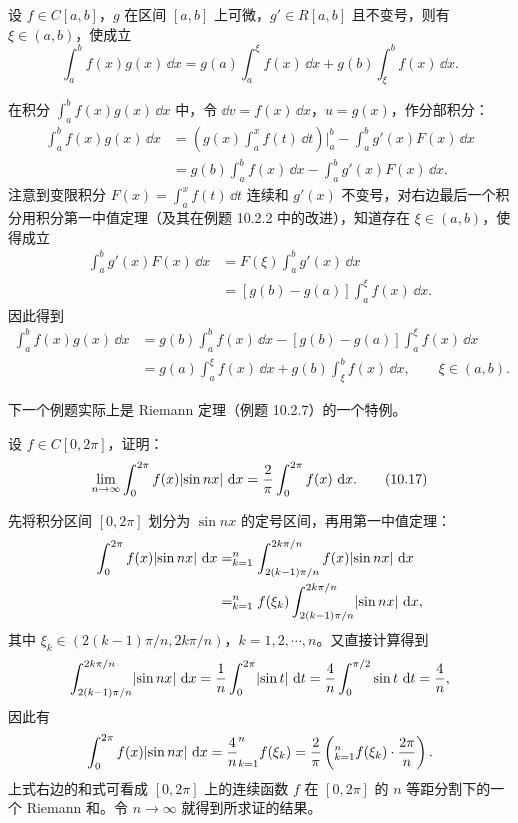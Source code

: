 \begin{xexample}[10.4.11]
设 $f\in C[a,b]$，$g$ 在区间 $[a,b]$ 上可微，$g'\in R[a,b]$ 且不变号，则有 $\xi\in(a,b)$，使成立
\[
  \int_a^b f(x)g(x)\,\dd x
  =g(a)\int_a^\xi f(x)\,\dd x+g(b)\int_\xi^b f(x)\,\dd x.
\]
\end{xexample}
\begin{xsolution}
在积分 $\int_a^b f(x)g(x)\,\dd x$ 中，令 $\dd v=f(x)\,\dd x$，$u=g(x)$，作分部积分：
\begin{align*}
  \int_a^b f(x)g(x)\,\dd x
  &=\left(g(x)\int_a^x f(t)\,\dd t\right)\Big|_a^b
    -\int_a^b g'(x)F(x)\,\dd x\\
  &=g(b)\int_a^b f(x)\,\dd x-\int_a^b g'(x)F(x)\,\dd x.
\end{align*}
注意到变限积分 $F(x)=\int_a^x f(t)\,\dd t$ 连续和 $g'(x)$ 不变号，对右边最后一个积分用积分第一中值定理（及其在例题 10.2.2 中的改进），知道存在 $\xi\in(a,b)$，使得成立
\begin{align*}
  \int_a^b g'(x)F(x)\,\dd x
  &=F(\xi)\int_a^b g'(x)\,\dd x\\
  &=[g(b)-g(a)]\int_a^\xi f(x)\,\dd x.
\end{align*}
因此得到
\begin{align*}
  \int_a^b f(x)g(x)\,\dd x
  &=g(b)\int_a^b f(x)\,\dd x-[g(b)-g(a)]\int_a^\xi f(x)\,\dd x\\
  &=g(a)\int_a^\xi f(x)\,\dd x+g(b)\int_\xi^b f(x)\,\dd x,
  \qquad \xi\in(a,b).
\end{align*}
\end{xsolution}

下一个例题实际上是 Riemann 定理（例题 10.2.7）的一个特例。

\begin{xexample}[10.4.12]
设 $f\in C[0,2\pi]$，证明：
\begin{equation}
  \lim_{n\to\infty}\int_0^{2\pi}f(x)\lvert\sin nx\rvert\,\mathop{}\!\mathrm{d} x
  =\frac2\pi\int_0^{2\pi}f(x)\,\mathop{}\!\mathrm{d} x.
  \tag{10.17}
  \label{eq:10.17}
\end{equation}
\end{xexample}
\begin{xsolution}
先将积分区间 $[0,2\pi]$ 划分为 $\sin nx$ 的定号区间，再用第一中值定理：
\begin{align*}
  \int_0^{2\pi}f(x)\lvert\sin nx\rvert\,\mathop{}\!\mathrm{d} x
  &=\relax_{k=1}^n\int_{2(k-1)\pi/n}^{2k\pi/n}f(x)\lvert\sin nx\rvert\,\mathop{}\!\mathrm{d} x\\
  &=\relax_{k=1}^n f(\xi_k)\int_{2(k-1)\pi/n}^{2k\pi/n}\lvert\sin nx\rvert\,\mathop{}\!\mathrm{d} x,
\end{align*}
其中 $\xi_k\in(2(k-1)\pi/n,2k\pi/n)$，$k=1,2,\cdots,n$。又直接计算得到
\[
  \int_{2(k-1)\pi/n}^{2k\pi/n}\lvert\sin nx\rvert\,\mathop{}\!\mathrm{d} x
  =\frac1n\int_0^{2\pi}\lvert\sin t\rvert\,\mathop{}\!\mathrm{d} t
  =\frac4n\int_0^{\pi/2}\sin t\,\mathop{}\!\mathrm{d} t
  =\frac4n,
\]
因此有
\[
  \int_0^{2\pi}f(x)\lvert\sin nx\rvert\,\mathop{}\!\mathrm{d} x
  =\frac4n\relax_{k=1}^n f(\xi_k)
  =\frac2\pi\left(\relax_{k=1}^n f(\xi_k)\cdot\frac{2\pi}{n}\right).
\]
上式右边的和式可看成 $[0,2\pi]$ 上的连续函数 $f$ 在 $[0,2\pi]$ 的 $n$ 等距分割下的一个 Riemann 和。令 $n\to\infty$ 就得到所求证的结果。
\end{xsolution}

